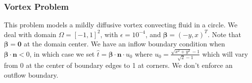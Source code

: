 \documentclass[letterpaper]{article}
\def\bbeta{\boldsymbol\beta}
\begin{document}
%

\subsubsection{Vortex Problem}
This problem models a mildly diffusive vortex convecting fluid in a circle. We
deal with domain $\Omega=[-1,1]^2$, with $\epsilon=10^{-4}$, and
$\bbeta=(-y,x)^T$. Note that $\bbeta=\mathbf{0}$ at the domain center. We have an
inflow boundary condition when $\bbeta\cdot\mathbf{n}<0$, in which case we set
$\hat t=\bbeta\cdot\mathbf{n}\cdot u_0$ where
$u_0=\frac{\sqrt{x^2+y^2}-1}{\sqrt{2}-1}$ which will vary from 0 at the center
of boundary edges to 1 at corners. We don't enforce an outflow boundary.
\end{document}
